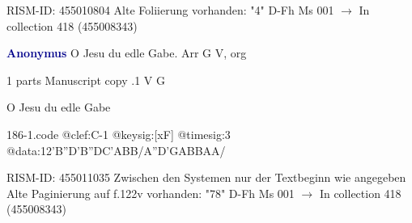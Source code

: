 \documentclass[twocolumn]{book}
\begin{document}
\newline RISM-ID: 455010804
\newline Alte Foliierung vorhanden: "4"
\newline D-Fh  Ms 001
\newline $\rightarrow$ In collection 418 (455008343)

\newline \par \vspace{7pt} \textcolor{darkblue}{\textbf{Anonymus  }}
\newline O Jesu du edle Gabe. Arr  G  
\newline V, org
\newline \begin{itshape}\end{itshape} 
\newline \textcolor{darkblue}{}  1 parts  
\newline Manuscript copy
.1  V  G
\newline \begin{footnotesize} O Jesu du edle Gabe \end{footnotesize}  
\begin{filecontents*}{186-1.code}
@clef:C-1
@keysig:[xF]
@timesig:3
@data:12'B''D'B''DC'ABB/A''D'GABBAA/
\end{filecontents*}
\newline
%

\newline RISM-ID: 455011035
\newline Zwischen den Systemen nur der Textbeginn wie angegeben
\newline Alte Paginierung auf f.122v vorhanden: "78"
\newline D-Fh  Ms 001
\newline $\rightarrow$ In collection 418 (455008343)
\end{document}
